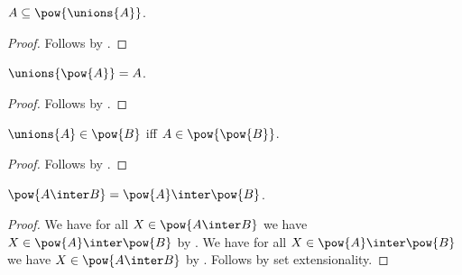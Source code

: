 \begin{proposition}\label{subseteq_pow_unions}
    $A\subseteq\pow{\unions{A}}$.
\end{proposition}
\begin{proof}
    Follows by .
\end{proof}

\begin{proposition}\label{unions_pow}
    $\unions{\pow{A}} = A$.
\end{proposition}
\begin{proof}
    Follows by .
\end{proof}


\begin{proposition}\label{unions_elem_pow_iff}
    $\unions{A}\in\pow{B}$ iff $A\in\pow{\pow{B}}$.
\end{proposition}
\begin{proof}
    Follows by .
\end{proof}

\begin{proposition}\label{pow_inter}
    $\pow{A\inter B} = \pow{A}\inter\pow{B}$.
\end{proposition}
\begin{proof}
    We have for all $X\in\pow{A\inter B}$
        we have $X\in\pow{A}\inter\pow{B}$
        by .
    We have for all $X\in\pow{A}\inter\pow{B}$
        we have $X\in\pow{A\inter B}$
        by .
    Follows by set extensionality.
\end{proof}
